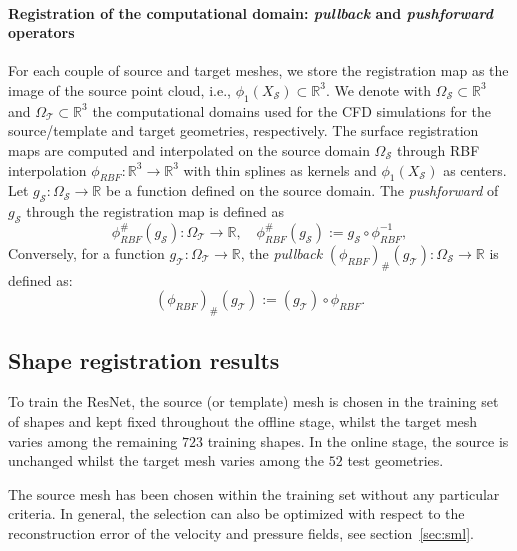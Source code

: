 \paragraph{Registration of the computational domain: \textit{pullback} and \textit{pushforward} operators}
For each couple of source and target meshes, we store the registration map as the image of the source point cloud, i.e.,  $\phi_1(X_{\mathcal{S}})\subset\mathbb{R}^3$. 
%
We denote with $\Omega_{\mathcal{S}}\subset\mathbb{R}^3$ and $\Omega_{\mathcal{T}}\subset\mathbb{R}^3$ the computational domains used for the CFD simulations for the source/template and target geometries, respectively. The surface registration maps are computed and interpolated on the source domain $\Omega_{\mathcal{S}}$ 
through RBF interpolation $\phi_{RBF}:\mathbb{R}^3\rightarrow\mathbb{R}^3$ with thin splines as kernels and $\phi_1(X_{\mathcal{S}})$ as centers.
Let $g_{\mathcal S}:\Omega_{\mathcal{S}}\rightarrow\mathbb{R}$ be a function defined on the source domain. The \textit{\textit{pushforward}} of $g_{\mathcal S}$ through the registration map
is defined as
\begin{equation}\label{eq:pushforward}
\phi_{RBF}^{\#}(g_{\mathcal S}):\Omega_{\mathcal{T}}\rightarrow\mathbb{R},\quad  \phi_{RBF}^{\#}(g_{\mathcal S}):=g_{\mathcal S} \circ\phi_{RBF}^{-1},
\end{equation}
Conversely, for a function  $g_{\mathcal T}:\Omega_{\mathcal{T}}\rightarrow\mathbb{R}$, the \textit{pullback} $(\phi_{RBF})_{\#} \left(g_{\mathcal T}\right):\Omega_{\mathcal{S}}\rightarrow\mathbb{R}$ is defined as:
\begin{equation}\label{eq:pullback}
  (\phi_{RBF})_{\#} \left(g_{\mathcal T}\right) :=\left(g_{\mathcal T} \right) \circ\phi_{RBF}.
\end{equation}



\subsection{Shape registration results}
To train the ResNet, the source (or template) mesh is chosen in the training set of shapes and kept fixed throughout the offline stage, 
whilst the target mesh varies among the remaining $723$ training shapes. 
In the online stage, the source is unchanged whilst the target mesh varies among the $52$ test geometries. 

\begin{rmk}
 The source mesh has been chosen within the training set without any particular criteria. In general, the selection can also be optimized with respect to the reconstruction error of the velocity and pressure fields, see section~\ref{sec:sml}.  
\end{rmk}


